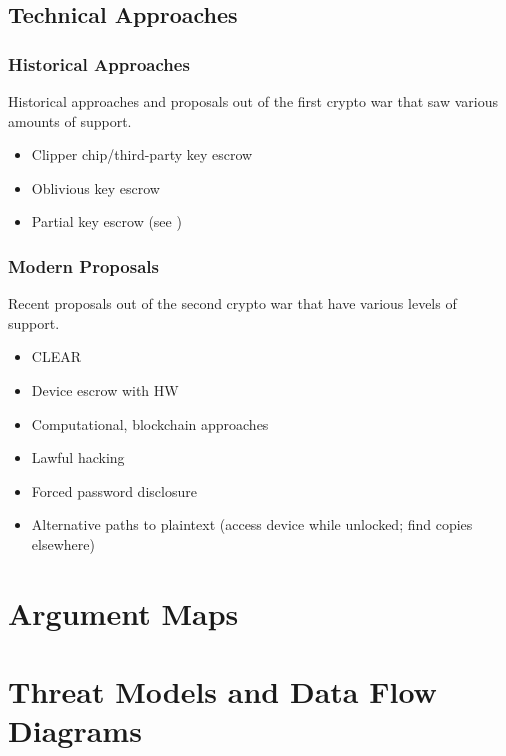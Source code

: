 \subsection{Technical Approaches}
\label{sec-tech-approaches}

\subsubsection*{Historical Approaches}

Historical approaches and proposals out of the first crypto war that saw various amounts of support.

\begin{itemize}
    \item Clipper chip/third-party key escrow \cite{blaze_protocol_1994}
    \item Oblivious key escrow \cite{goos_oblivious_1996}
    \item Partial key escrow (see \cite{denning_taxonomy_1996})
\end{itemize}

\subsubsection*{Modern Proposals}

Recent proposals out of the second crypto war that have various levels of support.

\begin{itemize}
    \item CLEAR \cite{ozzie_2018}
    \item Device escrow with HW \cite{savage_lawful_2018}
    \item Computational, blockchain approaches \cite{phan_key_2017}
    \item Lawful hacking \cite{nguyen_lawful_2017} \cite{soesanto_2018} \cite{kerr_encryption_2017}
    \item Forced password disclosure \cite{bittenbender_2019} \cite{kerr_encryption_2017}
    \item Alternative paths to plaintext (access device while unlocked; find copies elsewhere)
        \cite{kerr_encryption_2017}
\end{itemize}

\section{Argument Maps}
\label{sec-arg-maps-intro}



\section{Threat Models and Data Flow Diagrams}
\label{sec-threat-model-intro}
